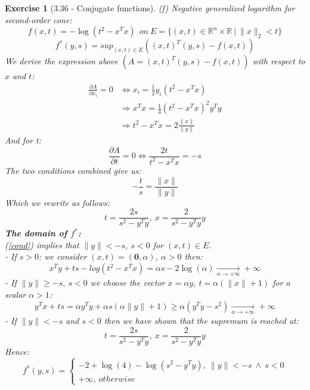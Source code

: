 \documentclass[11pt]{article}
\theoremstyle{exo}
\newtheorem*{exercise}{Exercise}
\newcommand{\R}{\mathbb{R}}
\newcommand{\1}{\mathbf{1}}
\newcommand{\0}{\mathbf{0}}
\begin{document}
\begin{exercise}[3.36 - Conjugate functions]
(f) Negative generalized logarithm for second-order cone:
\[f(x,t)=-\log(t^2-x^Tx)\:\:on \:E=\{(x,t)\in\R^n\times\R\:|\:\|x\|_2<t\}\]
\[f^*(y,s)=sup_{(x,t)\in E}((x,t)^T(y,s)-f(x,t))\]
We derive the expression above $(A=(x,t)^T(y,s)-f(x,t))$ with respect to $x$ and $t$:
\[\begin{split}
\frac{\partial A}{\partial x_i}=0 & \iff x_i=\frac{1}{2}y_i(t^2-x^Tx)\\
&\Rightarrow x^Tx=\frac{1}{4}(t^2-x^Tx)^2y^Ty\\
&\Rightarrow t^2-x^Tx=2\frac{\|x\|}{\|y\|}
\end{split}\]
And for t:
\[\frac{\partial A}{\partial t}=0\iff \frac{2t}{t^2-x^Tx}=-s\]
The two conditions combined give us:
\begin{equation}
\label{cond}
-\frac{t}{s}=\frac{\|x\|}{\|y\|}
\end{equation}
Which we rewrite as follows:
\[t=\frac{2s}{s^2-y^Ty},\:x=\frac{2}{s^2-y^Ty}y\]
\textbf{The domain of $f^*$:}\\
(\ref{cond}) implies that $\|y\|<-s$, $s<0$ for $(x,t)\in E$.\\
- If $s>0$: we consider $(x,t)=(\0,\alpha)$, $\alpha>0$ then:
\[x^Ty+ts-log(t^2-x^Tx)=\alpha s-2\log(\alpha)\xrightarrow[\alpha\to+\infty]{}+\infty\]
- If $\|y\|\geq -s,\:s<0$ we choose the vector $x=\alpha y$, $t=\alpha(\|x\|+1)$ for a scalar $\alpha>1$:
\[
y^Tx+ts =\alpha y^Ty+\alpha s(\alpha\|y\|+1)\geq \alpha (y^Ty-s^2) \xrightarrow[\alpha \to+\infty]{}+\infty
\]
- If $\|y\|<-s$ and $s<0$ then we have shown that the supremum is reached at:
\[t=\frac{2s}{s^2-y^Ty},\:x=\frac{2}{s^2-y^Ty}y\]
Hence:
\[
f^*(y,s)=
\begin{cases}
-2+\log(4)-\log(s^2-y^Ty),\:\|y\|<-s\:\wedge\: s<0\\
+\infty,\:otherwise
\end{cases}
\]

\end{exercise}
\end{document}
